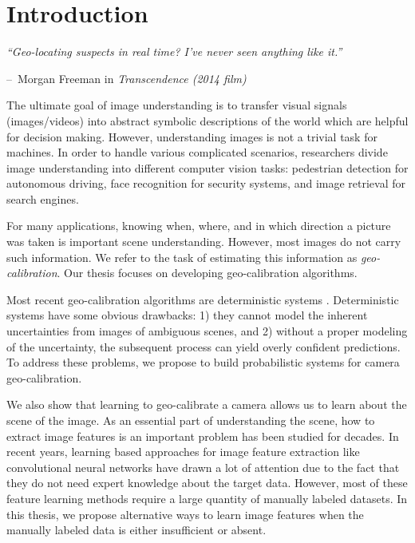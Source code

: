 \chapter{Introduction}
\label{chap:intro}

\makeatletter
\newenvironment{chapquote}[2][2em]
{\setlength{\@tempdima}{#1} \def\chapquote@author{#2} \parshape 1
  \@tempdima \dimexpr\textwidth-2\@tempdima\relax \itshape}
{\par\normalfont\hfill--\
\chapquote@author\hspace*{\@tempdima}\par\bigskip}
\makeatother

\begin{chapquote}{Morgan Freeman in {\em Transcendence (2014 film)}}
  ``Geo-locating suspects in real time? I've never seen anything like
it.''
\end{chapquote}

The ultimate goal of image understanding is to transfer visual
signals (images/videos) into abstract symbolic descriptions of the
world which are helpful for decision making.
However, understanding images is not a trivial task for machines.
In order to handle various complicated scenarios, researchers divide
image understanding into different computer vision tasks: pedestrian
detection for autonomous driving, face recognition for security
systems, and image retrieval for search engines.

For many applications, knowing when, where, and in which direction a
picture was taken is important scene understanding. However, most
images do not carry such information. 
We refer to the task of estimating this information as {\em
geo-calibration}. Our thesis focuses on developing geo-calibration
algorithms.

Most recent geo-calibration algorithms are deterministic systems
\todo{citations}. 
Deterministic systems have some obvious drawbacks: 1) they cannot
model the inherent uncertainties from images of ambiguous scenes, and
2) without a proper modeling of the uncertainty, the subsequent
process can yield overly confident predictions. To address these
problems, we propose to build probabilistic systems for camera
geo-calibration.

We also show that learning to geo-calibrate a camera allows us to
learn about the scene of the image.
As an essential part of understanding the scene, how to extract image
features is an important problem has been studied for decades.  In
recent years, learning based approaches for image feature extraction
like convolutional neural networks have drawn a lot of attention due
to the fact that they do not need expert knowledge about the target
data. However, most of these feature learning methods require a large
quantity of manually labeled datasets. In this thesis, we propose
alternative ways to learn image features when the
manually labeled data is either insufficient or absent.

